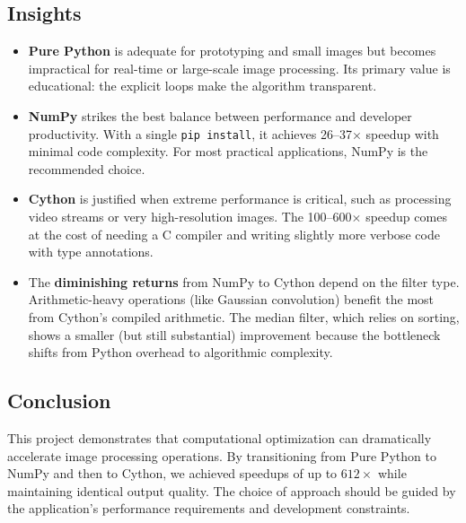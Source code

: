 \documentclass[12pt, a4paper]{article}
\begin{document}
\subsection{Insights}

\begin{itemize}
    \item \textbf{Pure Python} is adequate for prototyping and small images but becomes impractical for real-time or large-scale image processing. Its primary value is educational: the explicit loops make the algorithm transparent.

    \item \textbf{NumPy} strikes the best balance between performance and developer productivity. With a single \texttt{pip install}, it achieves 26--37$\times$ speedup with minimal code complexity. For most practical applications, NumPy is the recommended choice.

    \item \textbf{Cython} is justified when extreme performance is critical, such as processing video streams or very high-resolution images. The 100--600$\times$ speedup comes at the cost of needing a C compiler and writing slightly more verbose code with type annotations.

    \item The \textbf{diminishing returns} from NumPy to Cython depend on the filter type. Arithmetic-heavy operations (like Gaussian convolution) benefit the most from Cython's compiled arithmetic. The median filter, which relies on sorting, shows a smaller (but still substantial) improvement because the bottleneck shifts from Python overhead to algorithmic complexity.
\end{itemize}

\subsection{Conclusion}

This project demonstrates that computational optimization can dramatically accelerate image processing operations. By transitioning from Pure Python to NumPy and then to Cython, we achieved speedups of up to $612\times$ while maintaining identical output quality. The choice of approach should be guided by the application's performance requirements and development constraints.
\end{document}
